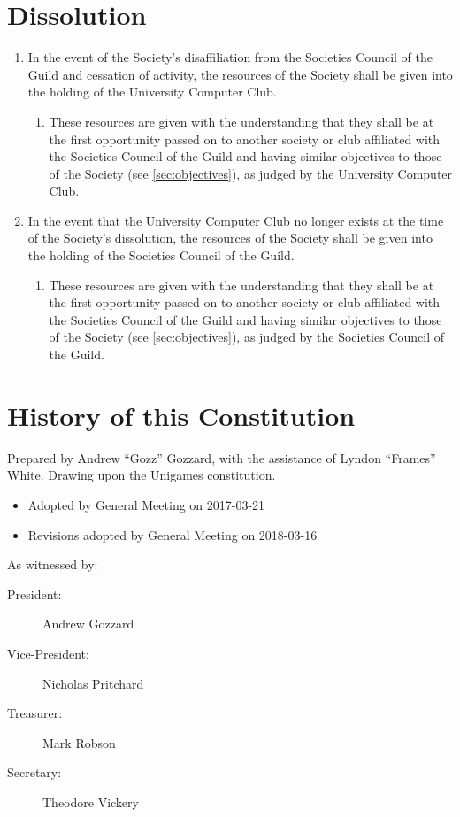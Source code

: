 \documentclass[a4paper]{article}
\newenvironment{enumsection}[1]{\section{#1} \begin{enumerate}[ref=\thesection.\theenumi]}{\end{enumerate}}
\begin{document}
\begin{enumsection}{Dissolution} \label{sec:dissolution}
    \item In the event of the Society's disaffiliation from the Societies Council of the Guild and cessation of activity, the resources of the Society shall be given into the holding of the University Computer Club.
    \begin{enumerate}
        \item These resources are given with the understanding that they shall be at the first opportunity passed on to another society or club affiliated with the Societies Council of the Guild and having similar objectives to those of the Society (see \cref{sec:objectives}), as judged by the University Computer Club.
    \end{enumerate}
    \item In the event that the University Computer Club no longer exists at the time of the Society's dissolution, the resources of the Society shall be given into the holding of the Societies Council of the Guild.
    \begin{enumerate}
        \item These resources are given with the understanding that they shall be at the first opportunity passed on to another society or club affiliated with the Societies Council of the Guild and having similar objectives to those of the Society (see \cref{sec:objectives}), as judged by the Societies Council of the Guild.
    \end{enumerate}
\end{enumsection}

\appendixpage

\appendix \section{History of this Constitution} \label{app:history}

\noindent Prepared by Andrew ``Gozz'' Gozzard, with the assistance of Lyndon ``Frames'' White. Drawing upon the Unigames constitution.

\medskip{}

\begin{itemize}
	\item[] Adopted by General Meeting on 2017-03-21
    \item[] Revisions adopted by General Meeting on 2018-03-16
\end{itemize}

\medskip{}

\noindent As witnessed by:
\begin{description}
\item [{President:}] Andrew Gozzard \hrulefill
\item [{Vice-President:}] Nicholas Pritchard \hrulefill
\item [{Treasurer:}] Mark Robson \hrulefill
\item [{Secretary:}] Theodore Vickery \hrulefill
\end{description}
\end{document}
